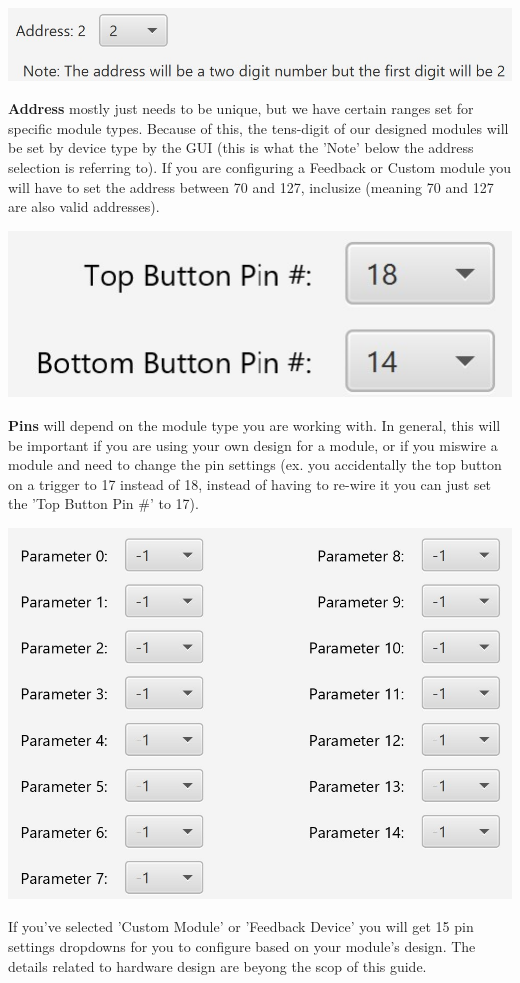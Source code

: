 \documentclass{article}
\begin{document}
\begin{center}
\includegraphics{AddrField}
\end{center}
\textbf{Address} mostly just needs to be unique, but we have certain ranges set for specific module types. Because of this, the tens-digit of our designed modules will be set by device type by the GUI (this is what the 'Note' below the address selection is referring to). If you are configuring a Feedback or Custom module you will have to set the address between 70 and 127, inclusize (meaning 70 and 127 are also valid addresses).

\begin{center}
\includegraphics{PinsField1}
\end{center}
\textbf{Pins} will depend on the module type you are working with. In general, this will be important if you are using your own design for a module, or if you miswire a module and need to change the pin settings (ex. you accidentally the top button on a trigger to 17 instead of 18, instead of having to re-wire it you can just set the 'Top Button Pin \#' to 17).

\begin{center}
\includegraphics{PinsField2}
\end{center}
If you've selected 'Custom Module' or 'Feedback Device' you will get 15 pin settings dropdowns for you to configure based on your module's design. The details related to hardware design are beyong the scop of this guide.
\end{document}
